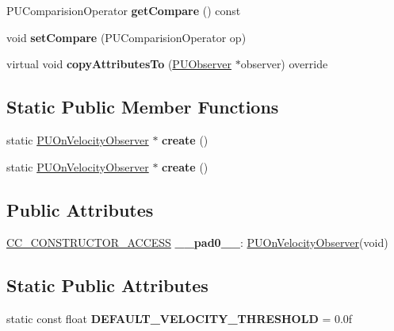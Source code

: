 \begin{DoxyCompactItemize}
P\+U\+Comparision\+Operator {\bfseries get\+Compare} () const
\item 
\mbox{\label{classPUOnVelocityObserver_a0a483eb57e4cff0624da42dbbac39d8e}} 
void {\bfseries set\+Compare} (P\+U\+Comparision\+Operator op)
\item 
\mbox{\label{classPUOnVelocityObserver_a6e4d1922f76f9067e5805eed22505472}} 
virtual void {\bfseries copy\+Attributes\+To} (\hyperlink{classPUObserver}{P\+U\+Observer} $\ast$observer) override
\end{DoxyCompactItemize}
\subsection*{Static Public Member Functions}
\begin{DoxyCompactItemize}
\item 
\mbox{\label{classPUOnVelocityObserver_a1f4b854930c94d77a9689149fad4a682}} 
static \hyperlink{classPUOnVelocityObserver}{P\+U\+On\+Velocity\+Observer} $\ast$ {\bfseries create} ()
\item 
\mbox{\label{classPUOnVelocityObserver_a79529653ce96fd2ce4dfaf2058554799}} 
static \hyperlink{classPUOnVelocityObserver}{P\+U\+On\+Velocity\+Observer} $\ast$ {\bfseries create} ()
\end{DoxyCompactItemize}
\subsection*{Public Attributes}
\begin{DoxyCompactItemize}
\item 
\mbox{\label{classPUOnVelocityObserver_ad61e1f4cc273d7d8d88ab24c1bae23b8}} 
\hyperlink{_2cocos2d_2cocos_2base_2ccConfig_8h_a25ef1314f97c35a2ed3d029b0ead6da0}{C\+C\+\_\+\+C\+O\+N\+S\+T\+R\+U\+C\+T\+O\+R\+\_\+\+A\+C\+C\+E\+SS} {\bfseries \+\_\+\+\_\+pad0\+\_\+\+\_\+}\+: \hyperlink{classPUOnVelocityObserver}{P\+U\+On\+Velocity\+Observer}(void)
\end{DoxyCompactItemize}
\subsection*{Static Public Attributes}
\begin{DoxyCompactItemize}
\item 
\mbox{\label{classPUOnVelocityObserver_ab2d2275b4e9b183c0074203e2cbe2860}} 
static const float {\bfseries D\+E\+F\+A\+U\+L\+T\+\_\+\+V\+E\+L\+O\+C\+I\+T\+Y\+\_\+\+T\+H\+R\+E\+S\+H\+O\+LD} = 0.\+0f
\end{DoxyCompactItemize}
